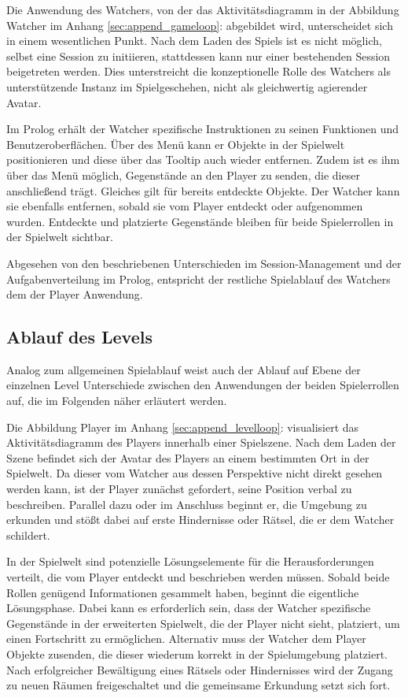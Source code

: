 Die Anwendung des Watchers, von der das Aktivitätsdiagramm in der Abbildung Watcher im Anhang \ref{sec:append_gameloop}:  abgebildet wird, unterscheidet sich in einem wesentlichen Punkt. Nach dem Laden des Spiels ist es nicht möglich, selbst eine Session zu initiieren, stattdessen kann nur einer bestehenden Session beigetreten werden. Dies unterstreicht die konzeptionelle Rolle des Watchers als unterstützende Instanz im Spielgeschehen, nicht als gleichwertig agierender Avatar.

Im Prolog erhält der Watcher spezifische Instruktionen zu seinen Funktionen und Benutzeroberflächen. Über des Menü  kann er Objekte in der Spielwelt positionieren und diese über das Tooltip auch wieder entfernen. Zudem ist es ihm über das Menü  möglich, Gegenstände an den Player zu senden, die dieser anschließend trägt. Gleiches gilt für bereits entdeckte Objekte. Der Watcher kann sie ebenfalls entfernen, sobald sie vom Player entdeckt oder aufgenommen wurden. Entdeckte und platzierte Gegenstände bleiben für beide Spielerrollen in der Spielwelt sichtbar.

Abgesehen von den beschriebenen Unterschieden im Session-Management und der Aufgabenverteilung im Prolog, entspricht der restliche Spielablauf des Watchers dem der Player Anwendung.

\subsection{Ablauf des Levels}

Analog zum allgemeinen Spielablauf weist auch der Ablauf auf Ebene der einzelnen Level Unterschiede zwischen den Anwendungen der beiden Spielerrollen auf, die im Folgenden näher erläutert werden. 

Die Abbildung Player im Anhang \ref{sec:append_levelloop}:  visualisiert das Aktivitätsdiagramm des Players innerhalb einer Spielszene. Nach dem Laden der Szene befindet sich der Avatar des Players an einem bestimmten Ort in der Spielwelt. Da dieser vom Watcher aus dessen Perspektive nicht direkt gesehen werden kann, ist der Player zunächst gefordert, seine Position verbal zu beschreiben. Parallel dazu oder im Anschluss beginnt er, die Umgebung zu erkunden und stößt dabei auf erste Hindernisse oder Rätsel, die er dem Watcher schildert. 

In der Spielwelt sind potenzielle Lösungselemente für die Herausforderungen verteilt, die vom Player entdeckt und beschrieben werden müssen. Sobald beide Rollen genügend Informationen gesammelt haben, beginnt die eigentliche Lösungsphase. Dabei kann es erforderlich sein, dass der Watcher spezifische Gegenstände in der erweiterten Spielwelt, die der Player nicht sieht, platziert, um einen Fortschritt zu ermöglichen. Alternativ muss der Watcher dem Player Objekte zusenden, die dieser wiederum korrekt in der Spielumgebung platziert. Nach erfolgreicher Bewältigung eines Rätsels oder Hindernisses wird der Zugang zu neuen Räumen freigeschaltet und die gemeinsame Erkundung setzt sich fort.

